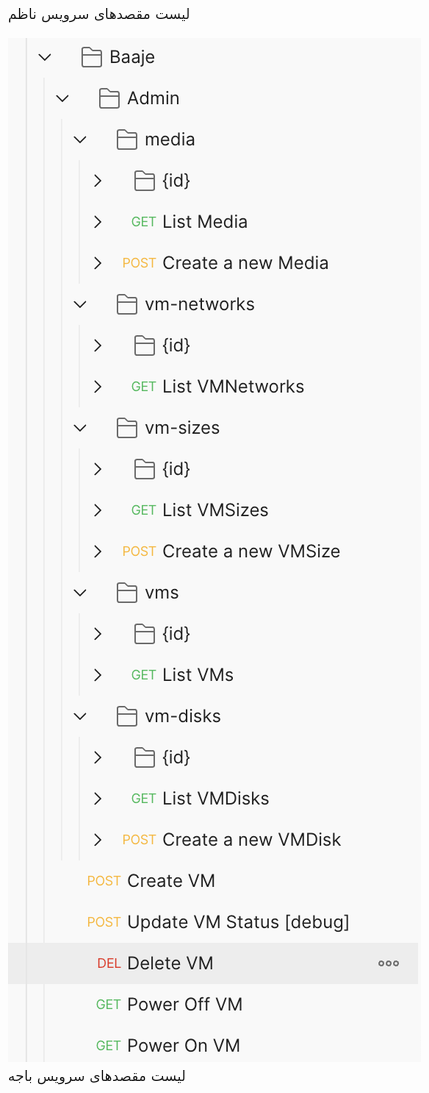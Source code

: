 \begin{figure}
\begin{minipage}[b]{0.45\textwidth}
		\caption{لیست مقصدهای سرویس ناظم}
		\label{fig:nazem-api}
	\end{minipage}
	\hfill
	\begin{minipage}[b]{0.45\textwidth}
		\includegraphics[width=\textwidth]{figures/baaje-api.png}
\caption{لیست مقصدهای سرویس باجه}
\label{fig:baaje-api}
	\end{minipage}
	
\end{figure}


